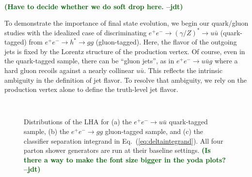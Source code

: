\documentclass[11pt,letterpaper]{article}
\DeclareRobustCommand{\Eq}[1]{Eq.~(\ref{#1})}
\newcommand{\jdt}[1]{\textbf{\textcolor{darkgreen}{(#1 --jdt)}}}
\begin{document}
\jdt{Have to decide whether we do soft drop here.}

To demonstrate the importance of final state evolution, we begin our quark/gluon studies with the idealized case of discriminating $e^+ e^- \to (\gamma/Z)^* \to u \bar{u}$ (quark-tagged) from $e^+ e^- \to h^* \to gg$ (gluon-tagged).  Here, the flavor of the outgoing jets is fixed by the Lorentz structure of the production vertex.  Of course, even in the quark-tagged sample, there can be ``gluon jets'', as in $e^+ e^- \to u \bar{u} g$ where a hard gluon recoils against a nearly collinear $u \bar{u}$.  This reflects the intrinsic ambiguity in the definition of jet flavor.   To resolve that ambiguity, we rely on the production vertex alone to define the truth-level jet flavor.

\begin{figure}
\centering
{}
$\quad$
$\quad$
\caption{Distributions of the LHA for (a) the $e^+ e^- \to u \bar{u}$ quark-tagged sample, (b) the $e^+ e^- \to gg$ gluon-tagged sample, and (c) the classifier separation integrand in \Eq{eq:deltaintegrand}.  All four parton shower generators are run at their baseline settings.  \jdt{Is there a way to make the font size bigger in the yoda plots?}}
\label{fig:LHA_hadron}
\end{figure}
\end{document}
